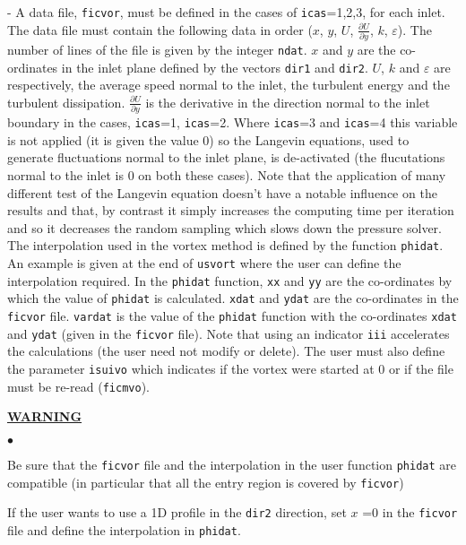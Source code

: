 {{{\begin{list}{-}{}
A data file, \texttt{ficvor}, must be defined in the cases of
\texttt{icas}=1,2,3, for each inlet. The data file must contain the following
data in order ($x$, $y$, $U$, $\displaystyle \frac{\partial U}
{\partial y}$, $k$, $\varepsilon$). The number of lines of the file is given by
the integer \texttt{ndat}. $x$ and $y$ are the co-ordinates in the inlet plane
defined by the vectors \texttt{dir1} and \texttt{dir2}. $U$, $k$ and
$\varepsilon$ are respectively, the average speed normal to the inlet,
the turbulent energy and the turbulent dissipation.
$\displaystyle \frac{\partial U}{\partial y}
$ is the derivative in the direction normal to the
 inlet boundary in the cases, \texttt{icas}=1, \texttt{icas}=2.
 Where \texttt{icas}=3 and \texttt{icas}=4 this variable is not applied
 (it is given the value 0) so the Langevin equations, used to generate
 fluctuations normal to the inlet plane, is de-activated
 (the flucutations normal to the inlet is 0 on both these cases).
 Note that the application of
 many different test of the Langevin equation doesn't have a notable influence
 on the results and that, by contrast it simply increases the computing time per
 iteration and so it decreases the random sampling which slows down the pressure
 solver. The interpolation used in the vortex method is defined by the function
 \texttt{phidat}. An example is given at the end of \texttt{usvort} where the
 user can define the interpolation required. In the \texttt{phidat} function,
 \texttt{xx} and \texttt{yy} are the co-ordinates by which the value of
 \texttt{phidat} is calculated. \texttt{xdat} and \texttt{ydat} are the
 co-ordinates in the \texttt{ficvor} file. \texttt{vardat} is the
 value of the \texttt{phidat} function with the co-ordinates \texttt{xdat}
 and \texttt{ydat} (given in the \texttt{ficvor} file). Note that using an
 indicator \texttt{iii} accelerates the calculations (the user need not modify or delete).
 The user must also define the parameter \texttt{isuivo} which indicates if the
 vortex were started at 0 or if the file must be re-read (\texttt{ficmvo}).

\end{list}

{\bf \underline{WARNING}}
\begin{list}{$\bullet$}{}
\item Be sure that the \texttt{ficvor} file and  the interpolation in the user
  function \texttt{phidat} are compatible (in particular that all the entry
  region is covered by \texttt{ficvor})
\item If the user wants to use a 1D profile in the \texttt{dir2} direction,
 set $x$ =0 in the \texttt{ficvor} file and define the interpolation in
 \texttt{phidat}.
\end{list}

}}}
